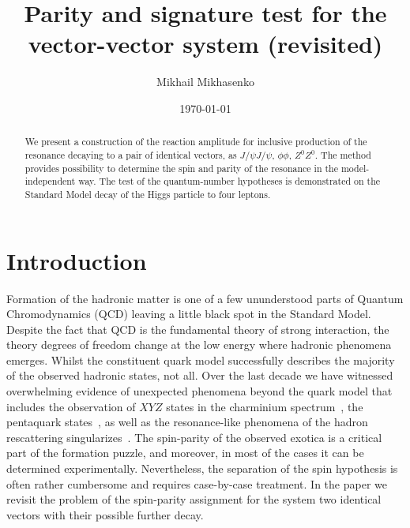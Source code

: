 \documentclass[prd,preprintnumbers,floatfix,
nofootinbib,superscriptaddress]{revtex4}
\begin{document}
\title{Parity and signature test for the vector-vector system (revisited)}

\author{Mikhail Mikhasenko}

\date{\today}

\begin{abstract}
  We present a construction of the reaction amplitude
  for inclusive production of the resonance decaying to a pair of identical vectors, as $J/\psi J/\psi$, $\phi\phi$, $Z^0 Z^0$.
  The method provides possibility to determine the spin and parity of the resonance in the model-independent way.
  The test of the quantum-number hypotheses is demonstrated on the Standard Model decay of the Higgs particle to four leptons.
\end{abstract}

\nopagebreak
\maketitle

%
\section{Introduction}

Formation of the hadronic matter is one of a few ununderstood parts of Quantum Chromodynamics (QCD) leaving a little black spot in the Standard Model.
Despite the fact that QCD is the fundamental theory of strong interaction,
the theory degrees of freedom change at the low energy where hadronic phenomena emerges.
Whilst the constituent quark model successfully describes the majority of the observed hadronic states, not all.
Over the last decade we have witnessed overwhelming evidence of unexpected phenomena beyond the quark model that
includes the observation of $XYZ$ states in the charminium spectrum~\cite{Godfrey:2008nc}, the pentaquark states~\cite{Aaij:2015tga,Aaij:2019vzc},
as well as the resonance-like phenomena of the hadron rescattering singularizes~\cite{Alexeev:2020lvq}.
The spin-parity of the observed exotica is a critical part of the formation puzzle, and moreover, in most of the cases it can be determined experimentally.
Nevertheless, the separation of the spin hypothesis is often rather cumbersome and requires case-by-case treatment.
In the paper we revisit the problem of the spin-parity assignment for the system two identical vectors with their possible further decay.
\end{document}
